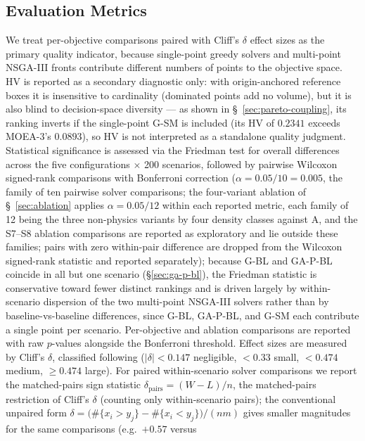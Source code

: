 \documentclass[preprint,12pt,authoryear]{elsarticle}
\begin{document}
\subsection{Evaluation Metrics}\label{sec:evaluation-metrics}
We treat per-objective comparisons paired with Cliff's $\delta$ effect sizes
as the primary quality indicator, because single-point greedy solvers and
multi-point NSGA-III fronts contribute different numbers of points to the
objective space. HV is reported as a secondary
diagnostic only: with origin-anchored reference boxes it is insensitive to
cardinality (dominated points add no volume), but it is also blind to
decision-space diversity --- as shown in \S~\ref{sec:pareto-coupling},
its ranking inverts if the single-point G-SM is included (its HV of $0.2341$
exceeds MOEA-3's $0.0893$), so HV is not interpreted as a standalone quality
judgment. Statistical significance is assessed via the Friedman test for
overall differences across the five configurations $\times$ 200 scenarios, followed by
pairwise Wilcoxon signed-rank comparisons with Bonferroni correction
($\alpha = 0.05 / 10 = 0.005$, the family of ten pairwise solver comparisons;
the four-variant ablation of \S~\ref{sec:ablation} applies $\alpha=0.05/12$
within each reported metric, each family of 12 being the three non-physics
variants by four density classes against A, and the S7--S8 ablation
comparisons are reported as exploratory and lie outside these families;
pairs with zero within-pair difference are dropped from the Wilcoxon
signed-rank statistic and reported separately); because G-BL and GA-P-BL
coincide in all but one scenario (\S\ref{sec:ga-p-bl}), the Friedman statistic
is conservative toward fewer distinct rankings and is driven largely by
within-scenario dispersion of the two multi-point NSGA-III solvers rather
than by baseline-vs-baseline differences, since G-BL, GA-P-BL, and G-SM
each contribute a single point per scenario.
Per-objective and ablation comparisons are
reported with raw $p$-values alongside the Bonferroni threshold. Effect
sizes are measured by Cliff's $\delta$, classified following
\citet{Romano2006} ($|\delta| < 0.147$ negligible,
$< 0.33$ small, $< 0.474$ medium, $\geq 0.474$ large).
For paired within-scenario solver comparisons we report the matched-pairs
sign statistic $\delta_{\text{pairs}} = (W - L)/n$, the matched-pairs
restriction of Cliff's $\delta$ (counting only within-scenario pairs); the
conventional unpaired form
$\delta = \bigl(\#\{x_i>y_j\}-\#\{x_i<y_j\}\bigr)/(nm)$
gives smaller magnitudes for the same comparisons (e.g.\ $+0.57$ versus
\end{document}

